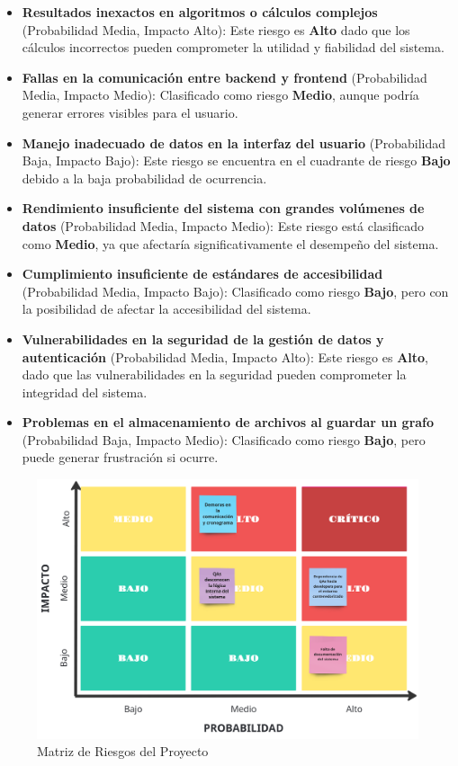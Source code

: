 \documentclass[stu, 12pt, letterpaper, donotrepeattitle, floatsintext, natbib]{apa7}
\begin{document}
\begin{itemize}
    \item \textbf{Resultados inexactos en algoritmos o cálculos complejos} (Probabilidad Media, Impacto Alto): Este riesgo es \textbf{Alto} dado que los cálculos incorrectos pueden comprometer la utilidad y fiabilidad del sistema.
    \item \textbf{Fallas en la comunicación entre backend y frontend} (Probabilidad Media, Impacto Medio): Clasificado como riesgo \textbf{Medio}, aunque podría generar errores visibles para el usuario.
    \item \textbf{Manejo inadecuado de datos en la interfaz del usuario} (Probabilidad Baja, Impacto Bajo): Este riesgo se encuentra en el cuadrante de riesgo \textbf{Bajo} debido a la baja probabilidad de ocurrencia.
    \item \textbf{Rendimiento insuficiente del sistema con grandes volúmenes de datos} (Probabilidad Media, Impacto Medio): Este riesgo está clasificado como \textbf{Medio}, ya que afectaría significativamente el desempeño del sistema.
    \item \textbf{Cumplimiento insuficiente de estándares de accesibilidad} (Probabilidad Media, Impacto Bajo): Clasificado como riesgo \textbf{Bajo}, pero con la posibilidad de afectar la accesibilidad del sistema.
    \item \textbf{Vulnerabilidades en la seguridad de la gestión de datos y autenticación} (Probabilidad Media, Impacto Alto): Este riesgo es \textbf{Alto}, dado que las vulnerabilidades en la seguridad pueden comprometer la integridad del sistema.
    \item \textbf{Problemas en el almacenamiento de archivos al guardar un grafo} (Probabilidad Baja, Impacto Medio): Clasificado como riesgo \textbf{Bajo}, pero puede generar frustración si ocurre.
\end{itemize}

\begin{figure}[H]
    \centering
    \caption{Matriz de Riesgos del Proyecto}
    \label{fig:project_risk_matrix}
    \includegraphics[width=\textwidth]{../imgs/matrix_proyecto.png}
\end{figure}
\end{document}
